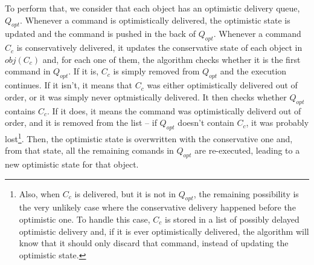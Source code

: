 \documentclass[times, 10pt]{article}
\begin{document}
To perform that, we consider that each object has an optimistic delivery queue, $Q_{opt}$. Whenever a command is optimistically delivered, the optimistic state is updated and the command is pushed in the back of $Q_{opt}$. Whenever a command $C_c$ is conservatively delivered, it updates the conservative state of each object in $obj(C_c)$ and, for each one of them, the algorithm checks whether it is the first command in $Q_{opt}$. If it is, $C_c$ is simply removed from $Q_{opt}$ and the execution continues. If it isn't, it means that $C_c$ was either optimistically delivered out of order, or it was simply never optmistically delivered. It then checks whether $Q_{opt}$ contains $C_c$. If it does, it means the command was optimistically deliverd out of order, and it is removed from the list -- if $Q_{opt}$ doesn't contain $C_c$, it was probably lost\footnote{Also, when $C_c$ is delivered, but it is not in $Q_{opt}$, the remaining possibility is the very unlikely case where the conservative delivery happened before the optimistic one. To handle this case, $C_c$ is stored in a list of possibly delayed optimistic delivery and, if it is ever optimistically delivered, the algorithm will know that it should only discard that command, instead of updating the optimistic state.}. Then, the optimistic state is overwritten with the conservative one and, from that state, all the remaining comands in $Q_{opt}$ are re-executed, leading to a new optimistic state for that object.


%
%
\end{document}
